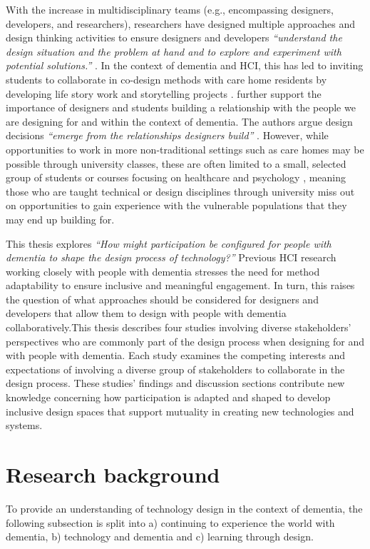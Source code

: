 With the increase in multidisciplinary teams (e.g., encompassing designers, developers, and researchers), researchers have designed multiple approaches and design thinking activities to ensure designers and developers  \textit{``understand the design situation and the problem at hand and to explore and experiment with potential solutions.''} \citep[pg. 21]{dalsgaard2017instruments}. In the context of dementia and HCI, this has led to inviting students to collaborate in co-design methods with care home residents by developing life story work \citep{foley_student_2020} and storytelling projects \citep{hannan_zeitgeist_2019}. \cite{hendriks_valuing_2018} further support the importance of designers and students building a relationship with the people we are designing for and within the context of dementia. The authors argue design decisions \textit{``emerge from the relationships designers build''} \citep[pg. 3]{hendriks_valuing_2018}. However, while opportunities to work in more non-traditional settings such as care homes may be possible through university classes, these are often limited to a small, selected group of students or courses focusing on healthcare and psychology \citep{kinnunen_understanding_2018}, meaning those who are taught technical or design disciplines through university miss out on opportunities to gain experience with the vulnerable populations that they may end up building for.

This thesis explores \textit{``How might participation be configured for people with dementia to shape the design process of technology?''} Previous HCI research working closely with people with dementia stresses the need for method adaptability to ensure inclusive and meaningful engagement. In turn, this raises the question of what approaches should be considered for designers and developers that allow them to design with people with dementia collaboratively.This thesis describes four studies involving diverse stakeholders' perspectives who are commonly part of the design process when designing for and with people with dementia. Each study examines the competing interests and expectations of involving a diverse group of stakeholders to collaborate in the design process. These studies' findings and discussion sections contribute new knowledge concerning how participation is adapted and shaped to develop inclusive design spaces that support mutuality in creating new technologies and systems.

\section{Research background}
\label{Intro: ResearchContext}
To provide an understanding of technology design in the context of dementia, the following subsection is split into a) continuing to experience the world with dementia, b) technology and dementia and c) learning through design. 


